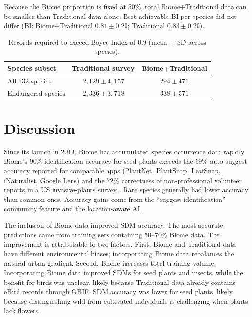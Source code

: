 \documentclass[11pt]{article}
\begin{document}
Because the Biome proportion is fixed at 50\%, total Biome+Traditional data can be smaller than Traditional data alone. Best-achievable BI per species did not differ (BI: Biome+Traditional $0.81 \pm 0.20$; Traditional $0.83 \pm 0.20$).

\begin{table}[h]
\centering
\caption{Records required to exceed Boyce Index of 0.9 (mean $\pm$ SD across species).}
\begin{tabular}{lcc}
\toprule
Species subset & Traditional survey & Biome+Traditional \\
\midrule
All 132 species & $2{,}129 \pm 4{,}157$ & $294 \pm 471$ \\
Endangered species & $2{,}336 \pm 3{,}718$ & $338 \pm 571$ \\
\bottomrule
\end{tabular}
\end{table}

\section{Discussion}
Since its launch in 2019, Biome has accumulated species occurrence data rapidly. Biome's 90\% identification accuracy for seed plants exceeds the 69\% auto-suggest accuracy reported for comparable apps (PlantNet, PlantSnap, LeafSnap, iNaturalist, Google Lens) \citep{hart2023} and the 72\% correctness of non-professional volunteer reports in a US invasive-plants survey \citep{crall2011}. Rare species generally had lower accuracy than common ones. Accuracy gains come from the ``suggest identification'' community feature and the location-aware AI.

The inclusion of Biome data improved SDM accuracy. The most accurate predictions came from training sets containing 50--70\% Biome data. The improvement is attributable to two factors. First, Biome and Traditional data have different environmental biases; incorporating Biome data rebalances the natural-urban gradient. Second, Biome increases total training volume. Incorporating Biome data improved SDMs for seed plants and insects, while the benefit for birds was unclear, likely because Traditional data already contains eBird records through GBIF. SDM accuracy was lower for seed plants, likely because distinguishing wild from cultivated individuals is challenging when plants lack flowers.
\end{document}
